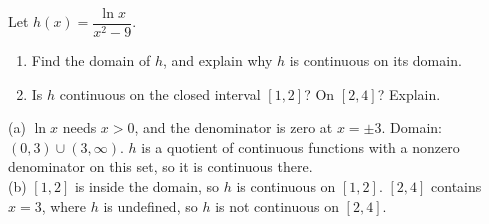 \begin{exo}{}
Let $h(x)=\dfrac{\ln x}{x^2-9}$.
\begin{enumerate}[label=(\alph*)]
\item Find the domain of $h$, and explain why $h$ is continuous on its domain.
\item Is $h$ continuous on the closed interval $[1,2]$? On $[2,4]$? Explain.
\end{enumerate}
\begin{solution}
(a) $\ln x$ needs $x>0$, and the denominator is zero at $x=\pm3$. Domain: $(0,3)\cup(3,\infty)$. $h$ is a quotient of continuous functions with a nonzero denominator on this set, so it is continuous there.\\
(b) $[1,2]$ is inside the domain, so $h$ is continuous on $[1,2]$. $[2,4]$ contains $x=3$, where $h$ is undefined, so $h$ is not continuous on $[2,4]$.
\end{solution}
\end{exo}

